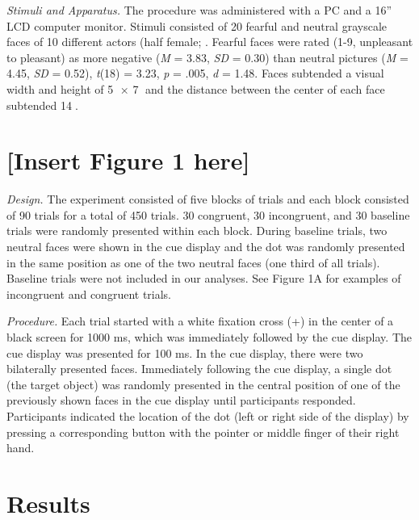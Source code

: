 \documentclass{article}
\begin{document}
	\emph{Stimuli and Apparatus. }The procedure was administered with a PC and a 16” LCD computer monitor. Stimuli consisted of 20 fearful and neutral grayscale faces of 10 different actors (half female; \textcite{[object Object], [object Object]}. Fearful faces were rated {\color{4472C4}(1-9, unpleasant to pleasant) }as more negative (\emph{M} = 3.83, \emph{SD} = 0.30) than neutral pictures (\emph{M} = 4.45, \emph{SD} = 0.52), \emph{t}(18) = 3.23, \emph{p} = .005, {\color{4472C4}\emph{d}}{\color{4472C4} = 1.48}. Faces subtended a visual width and height of 5 × 7 and the distance between the center of each face subtended 14.



	\section{\textbf{[Insert Figure 1 here]}}



	\emph{Design. }The experiment consisted of five blocks of trials and each block consisted of 90 trials for a total of 450 trials. 30 congruent, 30 incongruent, and 30 baseline trials were randomly presented within each block. During baseline trials, two neutral faces were shown in the cue display and the dot was randomly presented in the same position as one of the two neutral faces (one third of all trials). Baseline trials were not included in our analyses. See Figure 1A for examples of incongruent and congruent trials.



	\emph{Procedure. }Each trial started with a white fixation cross (+) in the center of a black screen for 1000 ms, which was immediately followed by the cue display. The cue display was presented for 100 ms. In the cue display, there were two bilaterally presented faces. Immediately following the cue display, a single dot (the target object) was randomly presented in the central position of one of the previously shown faces in the cue display until participants responded. Participants indicated the location of the dot (left or right side of the display) by pressing a corresponding button with the pointer or middle finger of their right hand.



	\section{Results}
\end{document}
